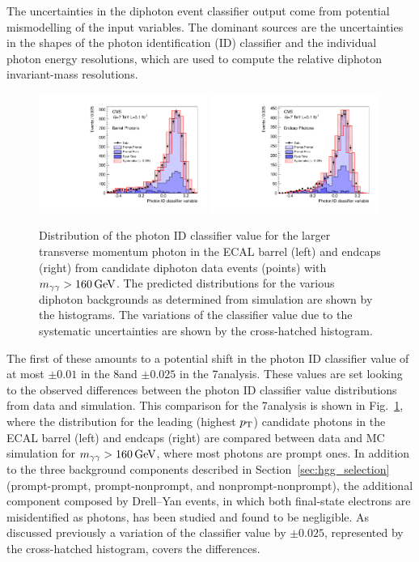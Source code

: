 \documentclass[12pt,twoside,a4paper,cmspaper,final,collab]{cms-tdr}
\begin{document}
The uncertainties in the diphoton event classifier output come from potential mismodelling of the input
variables. The dominant sources are the uncertainties in the shapes of the photon identification (ID) classifier and
the individual photon energy resolutions, which are used to compute the relative diphoton invariant-mass resolutions.

\begin{figure}
  \begin{center}
    \includegraphics[width=0.49\textwidth]{figures/hgg_phidmva1eb}
    \includegraphics[width=0.49\textwidth]{figures/hgg_phidmva1ee}
    \caption{
Distribution of the photon ID classifier value for the larger transverse momentum photon in the
ECAL barrel (left) and endcaps (right) from candidate diphoton data
events (points) with $m_{\gamma\gamma}>160\,\text{Ge\hspace{-.08em}V}$.
The predicted distributions for the various diphoton backgrounds as determined from simulation are shown by the histograms.
The variations of the classifier value due to the systematic uncertainties are shown by the cross-hatched histogram.}
    \label{fig:hgg_phoidshift}
  \end{center}
\end{figure}

The first of these
amounts to a potential shift in the photon ID classifier value of at
most ${\pm}0.01$ in the 8\TeV and ${\pm}0.025$ in the 7\TeV analysis.
These values are
set looking to
the observed differences between the  photon ID classifier value distributions from data and simulation.
This comparison for the 7\TeV analysis
is shown in Fig.~\ref{fig:hgg_phoidshift}, where the distribution for the leading (highest $p_{\mathrm{T}}$)
candidate photons in the ECAL barrel (left) and endcaps (right) are compared between data and MC simulation for
$m_{\gamma\gamma}>160\,\text{Ge\hspace{-.08em}V}$, where most photons are prompt ones.
In addition to the three background components described in Section~\ref{sec:hgg_selection} (prompt-prompt, prompt-nonprompt, and
nonprompt-nonprompt),
the additional component composed by Drell--Yan events, in which both final-state electrons are misidentified as photons, has been studied
and found to be negligible.
As discussed previously
a variation of the classifier value by ${\pm}0.025$, represented by the cross-hatched histogram, covers the
differences.
\end{document}

